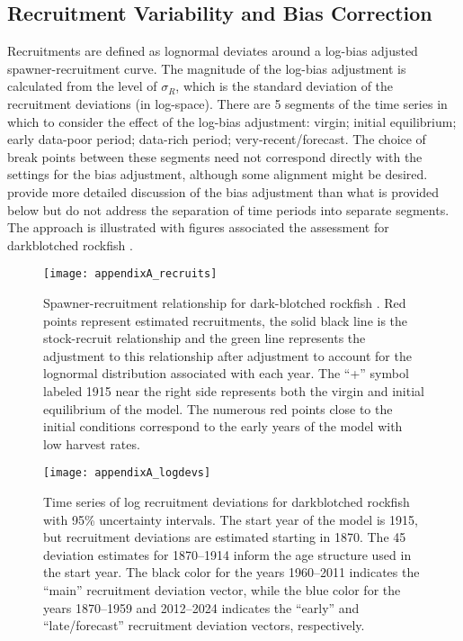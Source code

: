 \subsection{Recruitment Variability and Bias Correction}
\hypertarget{BiasCorrect}{}

Recruitments are defined as lognormal deviates around a log-bias adjusted spawner-recruitment curve. The magnitude of the log-bias adjustment is calculated from the level of $\sigma_R$, which is the standard deviation of the recruitment deviations (in log-space). There are 5 segments of the time series in which to consider the effect of the log-bias adjustment: virgin; initial equilibrium; early data-poor period; data-rich period; very-recent/forecast. The choice of break points between these segments need not correspond directly with the settings for the bias adjustment, although some alignment might be desired. \citet{methot-adjusting-2011} provide more detailed discussion of the bias adjustment than what is provided below but do not address the separation of time periods into separate segments. The approach is illustrated with figures associated the assessment for darkblotched rockfish \citep{gertseva-status-2013}.

\begin{figure}[H]
	\begin{center}
		\texttt{[image: appendixA\_recruits]}\\
	\end{center}	
	\caption{Spawner-recruitment relationship for dark-blotched rockfish \citep{gertseva-status-2013}. Red points represent estimated recruitments, the solid black line is the stock-recruit relationship and the green line represents the adjustment to this relationship after adjustment to account for the lognormal distribution associated with each year. The ``+'' symbol labeled 1915 near the right side represents both the virgin and initial equilibrium of the model. The numerous red points close to the initial conditions correspond to the early years of the model with low harvest rates.}
	\label{fig:recruits}	
\end{figure}

\begin{figure}[H]
	\begin{center}
		\texttt{[image: appendixA\_logdevs]}\\
	\end{center}
\caption{Time series of log recruitment deviations for darkblotched rockfish with 95\% uncertainty intervals. The start year of the model is 1915, but recruitment deviations are estimated starting in 1870. The 45 deviation estimates for 1870--1914 inform the age structure used in the start year. The black color for the years 1960--2011 indicates the ``main'' recruitment deviation vector, while the blue color for the years 1870--1959 and 2012--2024 indicates the ``early'' and ``late/forecast'' recruitment deviation vectors, respectively.}
\label{fig:recdevs}
\end{figure}

